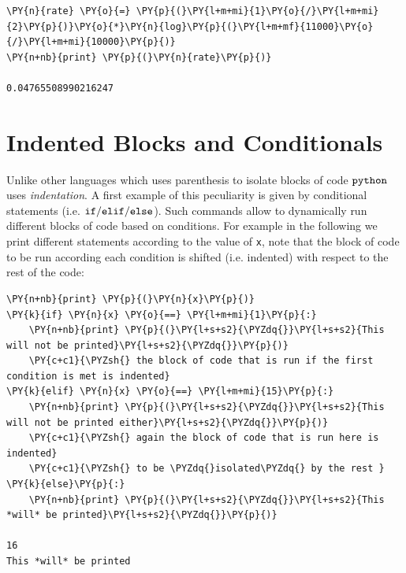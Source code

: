 \begin{tcolorbox}[breakable, size=fbox, boxrule=1pt, pad at break*=1mm, colback=cellbackground, colframe=cellborder]            
\begin{Verbatim}[commandchars=\\\{\}]
\PY{n}{rate} \PY{o}{=} \PY{p}{(}\PY{l+m+mi}{1}\PY{o}{/}\PY{l+m+mi}{2}\PY{p}{)}\PY{o}{*}\PY{n}{log}\PY{p}{(}\PY{l+m+mf}{11000}\PY{o}{/}\PY{l+m+mi}{10000}\PY{p}{)}
\PY{n+nb}{print} \PY{p}{(}\PY{n}{rate}\PY{p}{)}

0.04765508990216247
\end{Verbatim}
\end{tcolorbox}

\section{Indented Blocks and Conditionals}
\label{indented-blocks-and-the-ttifelse-statement}

Unlike other languages which uses parenthesis to isolate blocks of code $\tt{python}$ 
uses \emph{indentation}. A first example of this peculiarity is given by conditional statements 
(i.e. $\tt{if/elif/else}$). Such commands allow to dynamically run different blocks of code 
based on conditions. For example in the following we print different statements according to 
the value of \texttt{x}, note that the block of code to be run according each condition 
is shifted (i.e. indented) with respect to the rest of the code:

\begin{tcolorbox}[breakable, size=fbox, boxrule=1pt, pad at break*=1mm, colback=cellbackground, colframe=cellborder]            
\begin{Verbatim}[commandchars=\\\{\}]
\PY{n+nb}{print} \PY{p}{(}\PY{n}{x}\PY{p}{)}
\PY{k}{if} \PY{n}{x} \PY{o}{==} \PY{l+m+mi}{1}\PY{p}{:} 
    \PY{n+nb}{print} \PY{p}{(}\PY{l+s+s2}{\PYZdq{}}\PY{l+s+s2}{This will not be printed}\PY{l+s+s2}{\PYZdq{}}\PY{p}{)} 
    \PY{c+c1}{\PYZsh{} the block of code that is run if the first condition is met is indented}
\PY{k}{elif} \PY{n}{x} \PY{o}{==} \PY{l+m+mi}{15}\PY{p}{:}
    \PY{n+nb}{print} \PY{p}{(}\PY{l+s+s2}{\PYZdq{}}\PY{l+s+s2}{This will not be printed either}\PY{l+s+s2}{\PYZdq{}}\PY{p}{)}
    \PY{c+c1}{\PYZsh{} again the block of code that is run here is indented}
    \PY{c+c1}{\PYZsh{} to be \PYZdq{}isolated\PYZdq{} by the rest }
\PY{k}{else}\PY{p}{:}
    \PY{n+nb}{print} \PY{p}{(}\PY{l+s+s2}{\PYZdq{}}\PY{l+s+s2}{This *will* be printed}\PY{l+s+s2}{\PYZdq{}}\PY{p}{)}

16
This *will* be printed
\end{Verbatim}
\end{tcolorbox}

